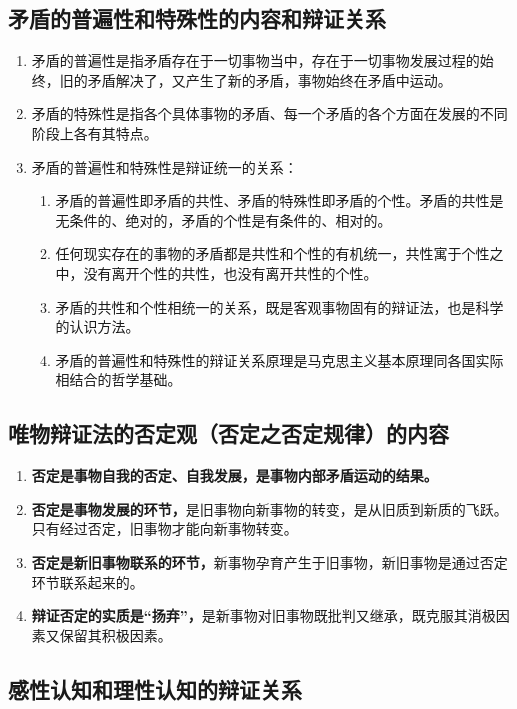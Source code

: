 \documentclass[12pt, a4paper, oneside]{ctexbook}
\begin{document}
\subsection{矛盾的普遍性和特殊性的内容和辩证关系}

\begin{enumerate}
\item 矛盾的普遍性是指矛盾存在于一切事物当中，存在于一切事物发展过程的始终，旧的矛盾解决了，又产生了新的矛盾，事物始终在矛盾中运动。
\item 矛盾的特殊性是指各个具体事物的矛盾、每一个矛盾的各个方面在发展的不同阶段上各有其特点。
\item 矛盾的普遍性和特殊性是辩证统一的关系：
\begin{enumerate}
\item 矛盾的普遍性即矛盾的共性、矛盾的特殊性即矛盾的个性。矛盾的共性是无条件的、绝对的，矛盾的个性是有条件的、相对的。
\item 任何现实存在的事物的矛盾都是共性和个性的有机统一，共性寓于个性之中，没有离开个性的共性，也没有离开共性的个性。
\item 矛盾的共性和个性相统一的关系，既是客观事物固有的辩证法，也是科学的认识方法。
\item 矛盾的普遍性和特殊性的辩证关系原理是马克思主义基本原理同各国实际相结合的哲学基础。
\end{enumerate}
\end{enumerate}

\subsection{唯物辩证法的否定观（否定之否定规律）的内容}

\begin{enumerate}
\item \textbf{否定是事物自我的否定、自我发展，是事物内部矛盾运动的结果。}
\item \textbf{否定是事物发展的环节，}是旧事物向新事物的转变，是从旧质到新质的飞跃。只有经过否定，旧事物才能向新事物转变。
\item \textbf{否定是新旧事物联系的环节，}新事物孕育产生于旧事物，新旧事物是通过否定环节联系起来的。
\item \textbf{辩证否定的实质是“扬弃”，}是新事物对旧事物既批判又继承，既克服其消极因素又保留其积极因素。
\end{enumerate}

\subsection{感性认知和理性认知的辩证关系}
\end{document}
